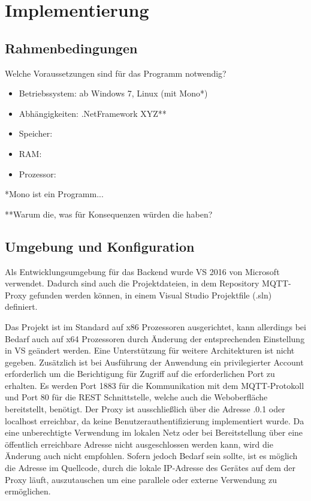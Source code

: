 \chapter{Implementierung}
\section{Rahmenbedingungen}
    Welche Voraussetzungen sind für das Programm notwendig?
    \begin{itemize}
        \item Betriebssystem: ab Windows 7, Linux (mit Mono*)
        \item Abhängigkeiten: .NetFramework XYZ**
        \item Speicher: 
        \item RAM: 
        \item Prozessor: 
    \end{itemize}
    
    *Mono ist ein Programm...
    
    **Warum die, was für Konsequenzen würden die haben?

\section{Umgebung und Konfiguration} %
    Als Entwicklungsumgebung für das Backend wurde \ac{VS} 2016 %
    von Microsoft verwendet. Dadurch sind auch die Projektdateien, in dem Repository \glqq MQTT-Proxy\grqq{} %
    gefunden werden können, in einem Visual Studio Projektfile (.sln) definiert.
    
    Das Projekt ist im Standard auf x86 Prozessoren ausgerichtet, kann allerdings bei Bedarf auch auf x64 Prozessoren durch Änderung der entsprechenden Einstellung in \ac{VS} geändert werden.
    Eine Unterstützung für weitere Architekturen ist nicht gegeben.
    Zusätzlich ist bei Ausführung der Anwendung ein privilegierter Account erforderlich um die Berichtigung für Zugriff auf die erforderlichen Port zu erhalten.
    Es werden Port 1883 für die Kommunikation mit dem \ac{MQTT}-Protokoll und Port 80 für die \ac{REST} Schnittstelle, welche auch die Weboberfläche bereitstellt, benötigt.
    Der Proxy ist ausschließlich über die Adresse .0.1\grqq{} oder \glqq localhost\grqq{} erreichbar, da keine Benutzerauthentifizierung implementiert wurde. Da eine unberechtigte Verwendung im lokalen Netz oder bei Bereitstellung über eine öffentlich erreichbare Adresse nicht ausgeschlossen werden kann, wird die Änderung auch nicht empfohlen. Sofern jedoch Bedarf sein sollte, ist es möglich die Adresse im Quellcode, durch die lokale IP-Adresse des Gerätes auf dem der Proxy läuft, auszutauschen um eine parallele oder externe Verwendung zu ermöglichen.
    
